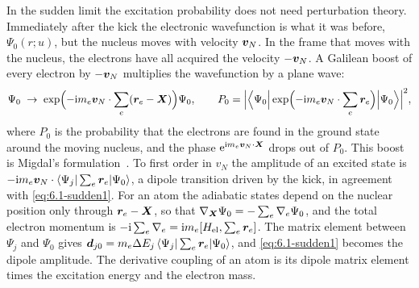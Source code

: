 In the sudden limit the excitation probability does not need perturbation theory. Immediately after the kick the electronic wavefunction is what it was before, $\Psi_0(r;u)$, but the nucleus moves with velocity $\bm{v}_N$. In the frame that moves with the nucleus, the electrons have all acquired the velocity $-\bm{v}_N$. A Galilean boost of every electron by $-\bm{v}_N$ multiplies the wavefunction by a plane wave:
\begin{equation}
  \Psi_0 \;\to\; \exp\Bigl(-\mathrm{i} m_e\bm{v}_N\cdot\sum_e(\bm{r}_e - \bm{X})\Bigr)\Psi_0 , \qquad
  P_0 = \Bigl|\Bigl\langle\Psi_0\Bigr|\exp\Bigl(-\mathrm{i} m_e\bm{v}_N\cdot\sum_e\bm{r}_e\Bigr)\Bigl|\Psi_0\Bigr\rangle\Bigr|^2 ,
  \label{eq:6.1-boost}
\end{equation}
where $P_0$ is the probability that the electrons are found in the ground state around the moving nucleus, and the phase $\mathrm{e}^{\mathrm{i} m_e\bm{v}_N\cdot\bm{X}}$ drops out of $P_0$. This boost is Migdal's formulation~\cites{migdal1941ionization}[Eqs.~(1) and~(2)]{ibe2018migdal}. To first order in $v_N$ the amplitude of an excited state is $-\mathrm{i} m_e\bm{v}_N\cdot\langle\Psi_j|\sum_e\bm{r}_e|\Psi_0\rangle$, a dipole transition driven by the kick, in agreement with \cref{eq:6.1-sudden1}. For an atom the adiabatic states depend on the nuclear position only through $\bm{r}_e - \bm{X}$, so that $\nabla_{\bm{X}}\Psi_0 = -\sum_e\nabla_e\Psi_0$, and the total electron momentum is $-\mathrm{i}\sum_e\nabla_e = \mathrm{i} m_e[H_{\mathrm{el}}, \sum_e\bm{r}_e]$. The matrix element between $\Psi_j$ and $\Psi_0$ gives $\bm{d}_{j0} = m_e\Delta E_j\,\langle\Psi_j|\sum_e\bm{r}_e|\Psi_0\rangle$, and \cref{eq:6.1-sudden1} becomes the dipole amplitude. The derivative coupling of an atom is its dipole matrix element times the excitation energy and the electron mass.

